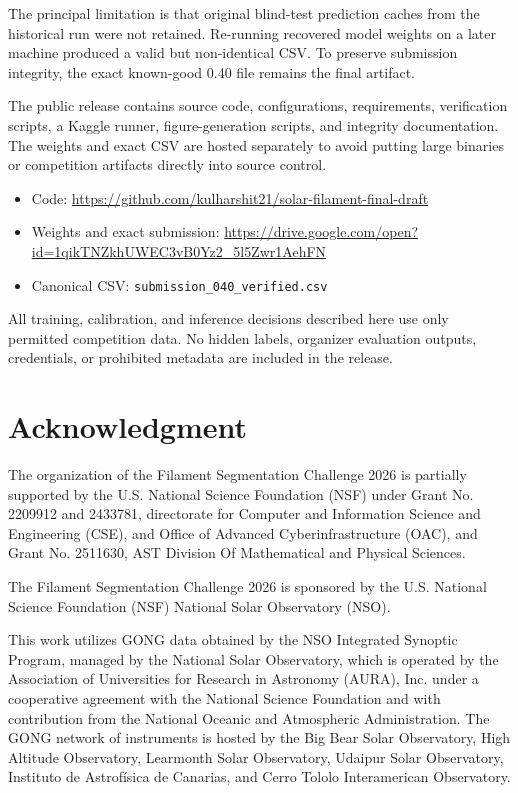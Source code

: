 \documentclass[sigconf]{acmart}
\begin{document}
The principal limitation is that original blind-test prediction caches from the historical run were not retained. Re-running recovered model weights on a later machine produced a valid but non-identical CSV. To preserve submission integrity, the exact known-good 0.40 file remains the final artifact.

The public release contains source code, configurations, requirements, verification scripts, a Kaggle runner, figure-generation scripts, and integrity documentation. The weights and exact CSV are hosted separately to avoid putting large binaries or competition artifacts directly into source control.

\begin{itemize}
\item Code: \url{https://github.com/kulharshit21/solar-filament-final-draft}
\item Weights and exact submission: \url{https://drive.google.com/open?id=1qikTNZkhUWEC3vB0Yz2_5l5Zwr1AehFN}
\item Canonical CSV: \texttt{submission\_040\_verified.csv}
\end{itemize}

All training, calibration, and inference decisions described here use only permitted competition data. No hidden labels, organizer evaluation outputs, credentials, or prohibited metadata are included in the release.

\clearpage
\section{Acknowledgment}
The organization of the Filament Segmentation Challenge 2026 is partially supported by the U.S. National Science Foundation (NSF) under Grant No. 2209912 and 2433781, directorate for Computer and Information Science and Engineering (CSE), and Office of Advanced Cyberinfrastructure (OAC), and Grant No. 2511630, AST Division Of Mathematical and Physical Sciences.

The Filament Segmentation Challenge 2026 is sponsored by the U.S. National Science Foundation (NSF) National Solar Observatory (NSO).

This work utilizes GONG data obtained by the NSO Integrated Synoptic Program, managed by the National Solar Observatory, which is operated by the Association of Universities for Research in Astronomy (AURA), Inc. under a cooperative agreement with the National Science Foundation and with contribution from the National Oceanic and Atmospheric Administration. The GONG network of instruments is hosted by the Big Bear Solar Observatory, High Altitude Observatory, Learmonth Solar Observatory, Udaipur Solar Observatory, Instituto de Astrofísica de Canarias, and Cerro Tololo Interamerican Observatory.
\end{document}

